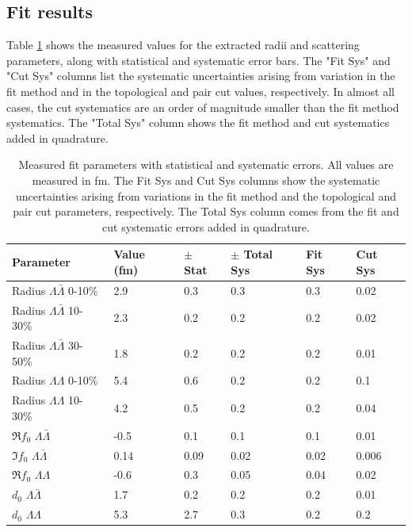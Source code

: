 \subsection{Fit results}
\label{sec:FitResults}

Table \ref{tab:FitParams} shows the measured values for the extracted radii and scattering parameters, along with statistical and systematic error bars.
The "Fit Sys" and "Cut Sys" columns list the systematic uncertainties arising from variation in the fit method and in the topological and pair cut values, respectively.
In almost all cases, the cut systematics are an order of magnitude smaller than the fit method systematics.
The "Total Sys" column shows the fit method and cut systematics added in quadrature.


\begin{table}
\begin{center}

\begin{tabular}{|l|l|l|l|l|l|}
\hline 
Parameter & Value (fm) & $\pm$ Stat & $\pm$ Total Sys & Fit Sys & Cut Sys \\ 
\hline 
Radius $\Lambda\bar{\Lambda}$ 0-10\% & 2.9 & 0.3 & 0.3 & 0.3 & 0.02 \\ 
\hline 
Radius $\Lambda\bar{\Lambda}$ 10-30\%  & 2.3 & 0.2 & 0.2 & 0.2 & 0.02 \\ 
\hline 
Radius $\Lambda\bar{\Lambda}$ 30-50\%  & 1.8 & 0.2 & 0.2 & 0.2 & 0.01 \\ 
\hline 
Radius $\Lambda\Lambda$ 0-10\% & 5.4 & 0.6 & 0.2 & 0.2 & 0.1 \\ 
\hline 
Radius $\Lambda\Lambda$ 10-30\% & 4.2 & 0.5 & 0.2 & 0.2 & 0.04 \\ 
\hline 
$\Re f_0$ $\Lambda\bar{\Lambda}$ & -0.5 & 0.1 & 0.1 & 0.1 & 0.01 \\ 
\hline 
$\Im f_0$ $\Lambda\bar{\Lambda}$ & 0.14 & 0.09 & 0.02 & 0.02 & 0.006 \\ 
\hline 
$\Re f_0$ $\Lambda\Lambda$ & -0.6 & 0.3 & 0.05 & 0.04 & 0.02 \\ 
\hline 
$d_0$ $\Lambda\bar{\Lambda}$ & 1.7 & 0.2 & 0.2 & 0.2 & 0.01 \\ 
\hline 
$d_0$ $\Lambda\Lambda$ & 5.3 & 2.7 & 0.3 & 0.2 & 0.2 \\ 
\hline 
\end{tabular} 
\end{center}
\caption[Fit results]{Measured fit parameters with statistical and systematic errors.
All values are measured in fm.
The Fit Sys and Cut Sys columns show the systematic uncertainties arising from variations in the fit method and the topological and pair cut parameters, respectively.
The Total Sys column comes from the fit and cut systematic errors added in quadrature. }
\label{tab:FitParams}
\end{table}






